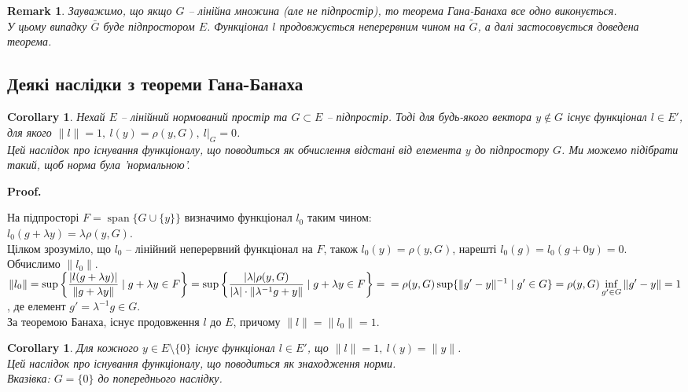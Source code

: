 \documentclass[a4paper, 10pt]{article}
\makeatletter
\theoremstyle{theoremdd}
\theoremstyle{theoremdd}
\theoremstyle{theoremdd}
\theoremstyle{theoremdd}
\theoremstyle{theoremdd}
\theoremstyle{theoremdd}
\newtheorem{remark}[theorem]{Remark}
\theoremstyle{theoremdd}
\theoremstyle{theoremdd}
\newtheorem{corollary}[theorem]{Corollary}
\renewenvironment{proof}[1][Proof.\\]{\par
\pushQED{\hfill \qed}%
\normalfont \topsep6\p@\@plus6\p@\relax
\trivlist
\item\relax
{\bfseries
#1\@addpunct{.}}\hspace\labelsep\ignorespaces
}{%
\popQED\endtrivlist\@endpefalse
}
\DeclareMathOperator{\linspan}{span}
\makeatother
\begin{document}
\begin{remark}
Зауважимо, що якщо $G$ -- лінійна множина (але не підпростір), то теорема Гана-Банаха все одно виконується.\\
У цьому випадку $\bar{G}$ буде підпростором $E$. Функціонал $l$ продовжується неперервним чином на $\tilde{G}$, а далі застосовується доведена теорема.
\end{remark}


\subsection{Деякі наслідки з теореми Гана-Банаха}
\begin{corollary}
Нехай $E$ -- лінійний нормований простір та $G \subset E$ -- підпростір. Тоді для будь-якого вектора $y \notin G$ існує функціонал $l \in E'$, для якого $\|l\| = 1,\ l(y) = \rho(y,G),\ l|_G = 0$.\\
\textit{Цей наслідок про існування функціоналу, що поводиться як обчислення відстані від елемента $y$ до підпростору $G$. Ми можемо підібрати такий, щоб норма була 'нормальною'.}
\end{corollary}

\begin{proof}
На підпросторі $F = \linspan\{G \cup \{y\}\}$ визначимо функціонал $l_0$ таким чином:\\
$l_0(g + \lambda y) = \lambda \rho(y,G)$.\\
Цілком зрозуміло, що $l_0$ -- лінійний неперервний функціонал на $F$, також $l_0(y) = \rho(y,G)$, нарешті $l_0(g) = l_0(g+0y) = 0$. Обчислимо $\|l_0\|$.\\
$\|l_0\| = \displaystyle\sup \left\{ \dfrac{|l(g+\lambda y)|}{\|g+\lambda y\|} \mid g + \lambda y \in F \right\} = \sup\left\{ \dfrac{|\lambda| \rho(y,G)}{|\lambda| \cdot \|\lambda^{-1}g + y \|} \mid g+\lambda y \in F \right\} = \\ = \rho(y,G) \sup \{ \|g'-y\|^{-1} \mid g' \in G \} = \rho(y,G) \inf_{g' \in G} \|g'-y\| = 1$, де елемент $g' = \lambda^{-1}g \in G$.\\
За теоремою Банаха, існує продовження $l$ до $E$, причому $\|l\| = \|l_0\| = 1$.
\end{proof}

\begin{corollary}
Для кожного $y \in E \setminus \{0\}$ існує функціонал $l \in E'$, що $\|l\| = 1,\ l(y) = \|y\|$.\\
\textit{Цей наслідок про існування функціоналу, що поводиться як знаходження норми.}\\
\textit{Вказівка: $G = \{0\}$ до попереднього наслідку}.
\end{corollary}
\end{document}
